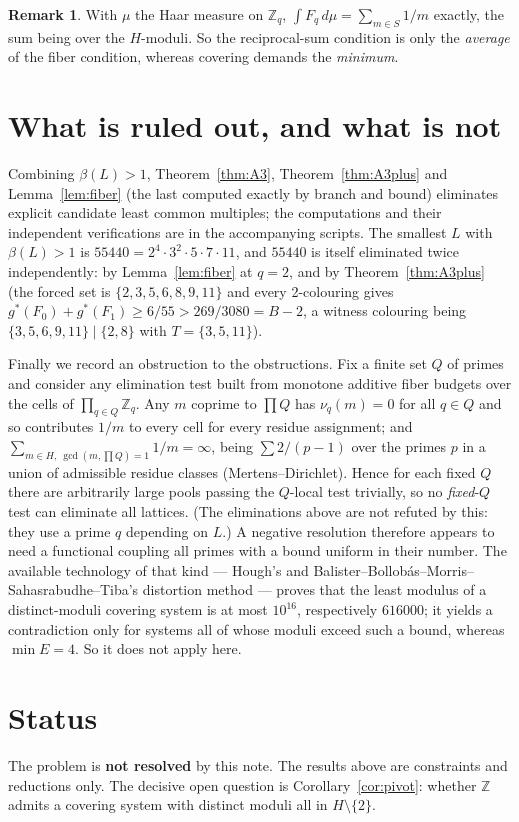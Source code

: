 \documentclass[11pt]{article}
\theoremstyle{definition}
\newtheorem{remark}[theorem]{Remark}
\begin{document}
\begin{remark}
With $\mu$ the Haar measure on $\mathbb Z_q$, $\int F_q\,d\mu=\sum_{m\in S}1/m$ exactly, the sum
being over the \emph{$H$}-moduli. So the reciprocal-sum condition is only the \emph{average} of the
fiber condition, whereas covering demands the \emph{minimum}.
\end{remark}

\section{What is ruled out, and what is not}

Combining $\beta(L)>1$, Theorem~\ref{thm:A3}, Theorem~\ref{thm:A3plus} and Lemma~\ref{lem:fiber}
(the last computed exactly by branch and bound) eliminates explicit candidate least common
multiples; the computations and their independent verifications are in the accompanying scripts.
The smallest $L$ with $\beta(L)>1$ is $55440=2^4\cdot3^2\cdot5\cdot7\cdot11$, and $55440$ is itself
eliminated twice independently: by Lemma~\ref{lem:fiber} at $q=2$, and by
Theorem~\ref{thm:A3plus} (the forced set is $\{2,3,5,6,8,9,11\}$ and every 2-colouring gives
$g^*(F_0)+g^*(F_1)\ge 6/55>269/3080=B-2$, a witness colouring being
$\{3,5,6,9,11\}\mid\{2,8\}$ with $T=\{3,5,11\}$).

Finally we record an obstruction to the obstructions. Fix a finite set $Q$ of primes and consider
any elimination test built from monotone additive fiber budgets over the cells of
$\prod_{q\in Q}\mathbb Z_q$. Any $m$ coprime to $\prod Q$ has $\nu_q(m)=0$ for all $q\in Q$ and so
contributes $1/m$ to every cell for every residue assignment; and
$\sum_{m\in H,\ \gcd(m,\prod Q)=1}1/m=\infty$, being $\sum 2/(p-1)$ over the primes $p$ in a union
of admissible residue classes (Mertens--Dirichlet). Hence for each fixed $Q$ there are arbitrarily
large pools passing the $Q$-local test trivially, so no \emph{fixed}-$Q$ test can eliminate all
lattices. (The eliminations above are not refuted by this: they use a prime $q$ depending on $L$.)
A negative resolution therefore appears to need a functional coupling all primes with a bound
uniform in their number. The available technology of that kind --- Hough's and
Balister--Bollob\'as--Morris--Sahasrabudhe--Tiba's distortion method --- proves that the least
modulus of a distinct-moduli covering system is at most $10^{16}$, respectively $616000$; it
yields a contradiction only for systems all of whose moduli exceed such a bound, whereas
$\min E=4$. So it does not apply here.

\section*{Status}

The problem is \textbf{not resolved} by this note. The results above are constraints and
reductions only. The decisive open question is Corollary~\ref{cor:pivot}: whether $\mathbb Z$
admits a covering system with distinct moduli all in $H\setminus\{2\}$.
\end{document}
